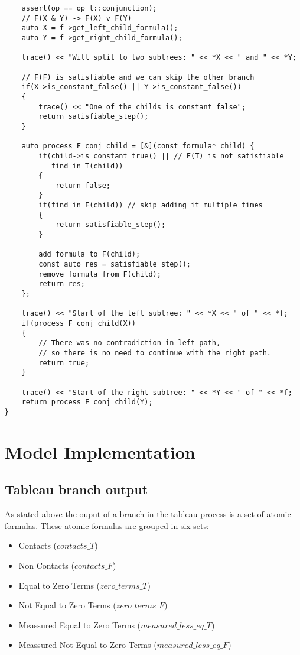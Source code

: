 \documentclass{article}
\begin{document}
\begin{lstlisting}
    assert(op == op_t::conjunction);
    // F(X & Y) -> F(X) v F(Y)
    auto X = f->get_left_child_formula();
    auto Y = f->get_right_child_formula();

    trace() << "Will split to two subtrees: " << *X << " and " << *Y;

    // F(F) is satisfiable and we can skip the other branch
    if(X->is_constant_false() || Y->is_constant_false())
    {
        trace() << "One of the childs is constant false";
        return satisfiable_step();
    }

    auto process_F_conj_child = [&](const formula* child) {
        if(child->is_constant_true() || // F(T) is not satisfiable
           find_in_T(child))
        {
            return false;
        }
        if(find_in_F(child)) // skip adding it multiple times
        {
            return satisfiable_step();
        }

        add_formula_to_F(child);
        const auto res = satisfiable_step();
        remove_formula_from_F(child);
        return res;
    };

    trace() << "Start of the left subtree: " << *X << " of " << *f;
    if(process_F_conj_child(X))
    {
        // There was no contradiction in left path,
        // so there is no need to continue with the right path.
        return true;
    }

    trace() << "Start of the right subtree: " << *Y << " of " << *f;
    return process_F_conj_child(Y);
}
\end{lstlisting}

	\newpage
	\section{Model Implementation}

	\subsection*{Tableau branch output}
	\label{tableau:branch:output}
	As stated above the ouput of a branch in the tableau process is a set of atomic formulas. These atomic formulas are grouped in six sets:
	\begin{itemize}
		\item Contacts ($contacts\_T$)
		\item Non Contacts ($contacts\_F$)
		\item Equal to Zero Terms ($zero\_terms\_T$)
		\item Not Equal to Zero Terms ($zero\_terms\_F$)
		\item Meassured Equal to Zero Terms ($measured\_less\_eq\_T$)
		\item Meassured Not Equal to Zero Terms ($measured\_less\_eq\_F$)
	\end{itemize}
\end{document}
